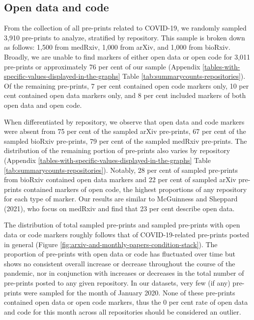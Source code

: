 \documentclass[
]{article}
\begin{document}
\hypertarget{open-data-and-code}{%
\subsection{Open data and code}\label{open-data-and-code}}

From the collection of all pre-prints related to COVID-19, we randomly sampled 3,910 pre-prints to analyze, stratified by repository. This sample is broken down as follows: 1,500 from medRxiv, 1,000 from arXiv, and 1,000 from bioRxiv. Broadly, we are unable to find markers of either open data or open code for 3,011 pre-prints or approximately 76 per cent of our sample (Appendix \ref{tables-with-specific-values-displayed-in-the-graphs} Table \ref{tab:summarycounts-repositories}). Of the remaining pre-prints, 7 per cent contained open code markers only, 10 per cent contained open data markers only, and 8 per cent included markers of both open data and open code.

When differentiated by repository, we observe that open data and code markers were absent from 75 per cent of the sampled arXiv pre-prints, 67 per cent of the sampled bioRxiv pre-prints, 79 per cent of the sampled medRxiv pre-prints. The distribution of the remaining portion of pre-prints also varies by repository (Appendix \ref{tables-with-specific-values-displayed-in-the-graphs} Table \ref{tab:summarycounts-repositories}). Notably, 28 per cent of sampled pre-prints from bioRxiv contained open data markers and 22 per cent of sampled arXiv pre-prints contained markers of open code, the highest proportions of any repository for each type of marker. Our results are similar to McGuinness and Sheppard (2021), who focus on medRxiv and find that 23 per cent describe open data.

The distribution of total sampled pre-prints and sampled pre-prints with open data or code markers roughly follows that of COVID-19-related pre-prints posted in general (Figure \ref{fig:arxiv-and-monthly-papers-condition-stack}). The proportion of pre-prints with open data or code has fluctuated over time but shows no consistent overall increase or decrease throughout the course of the pandemic, nor in conjunction with increases or decreases in the total number of pre-prints posted to any given repository. In our datasets, very few (if any) pre-prints were sampled for the month of January 2020. None of these pre-prints contained open data or open code markers, thus the 0 per cent rate of open data and code for this month across all repositories should be considered an outlier.
\end{document}
